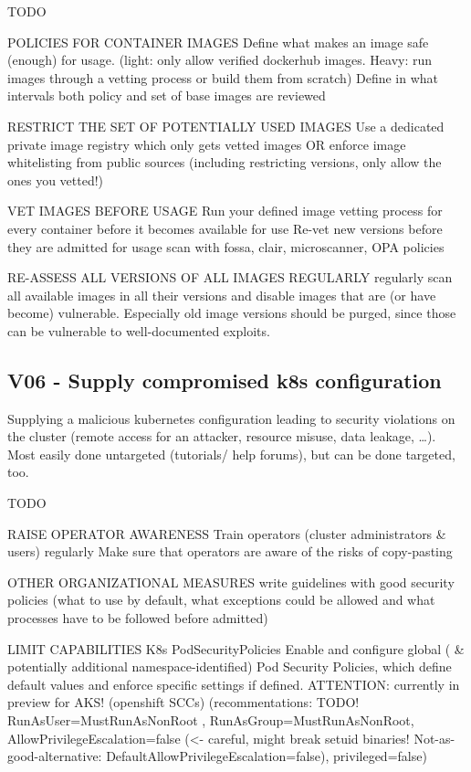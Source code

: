 TODO

POLICIES FOR CONTAINER IMAGES
	Define what makes an image safe (enough) for usage. (light: only allow verified dockerhub images. Heavy: run images through a vetting process or build them from scratch)
	Define in what intervals both policy and set of base images are reviewed

RESTRICT THE SET OF POTENTIALLY USED IMAGES
	Use a dedicated private image registry which only gets vetted images OR enforce image whitelisting from public sources (including restricting versions, only allow the ones you vetted!)
	
VET IMAGES BEFORE USAGE
	Run your defined image vetting process for every container before it becomes available for use
	Re-vet new versions before they are admitted for usage
	scan with fossa, clair, microscanner, OPA policies

RE-ASSESS ALL VERSIONS OF ALL IMAGES REGULARLY
	regularly scan all available images in all their versions and disable images that are (or have become) vulnerable. Especially old image versions should be purged, since those can be vulnerable to well-documented exploits.

\subsection{V06 - Supply compromised k8s configuration}
Supplying a malicious kubernetes configuration leading to security violations on the cluster (remote access for an attacker, resource misuse, data leakage, …). Most easily done untargeted (tutorials/ help forums), but can be done targeted, too.

TODO

RAISE OPERATOR AWARENESS
	Train operators (cluster administrators \& users) regularly									
	Make sure that operators are aware of the risks of copy-pasting									
										
OTHER ORGANIZATIONAL MEASURES
	write guidelines with good security policies (what to use by default, what exceptions could be allowed and what processes have to be followed before admitted)	

LIMIT CAPABILITIES
	K8s PodSecurityPolicies			Enable and configure global ( \& potentially additional namespace-identified) Pod Security Policies, which define default values and enforce specific settings if defined. ATTENTION: currently in preview for AKS!						
	(openshift SCCs)			(recommentations: TODO! RunAsUser=MustRunAsNonRoot , RunAsGroup=MustRunAsNonRoot, AllowPrivilegeEscalation=false (<- careful, might break setuid binaries! Not-as-good-alternative: DefaultAllowPrivilegeEscalation=false), privileged=false)						
										
